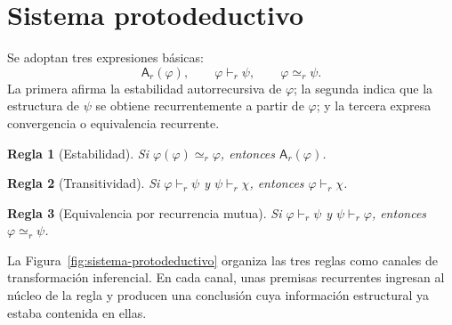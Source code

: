 \documentclass[11pt]{article}
\numberwithin{equation}{section}
\theoremstyle{prism}
\newtheorem{regla}{Regla}
\newcommand{\peq}{\simeq_{\!r}}
\begin{document}
\section{Sistema protodeductivo}

Se adoptan tres expresiones básicas:
\[
  \mathsf{A}_r(\varphi),
  \qquad
  \varphi\vdash_r\psi,
  \qquad
  \varphi\peq\psi.
\]
La primera afirma la estabilidad autorrecursiva de $\varphi$; la segunda indica
que la estructura de $\psi$ se obtiene recurrentemente a partir de $\varphi$; y
la tercera expresa convergencia o equivalencia recurrente.

\begin{regla}[Estabilidad]
Si $\varphi(\varphi)\peq\varphi$, entonces
$\mathsf{A}_r(\varphi)$.
\end{regla}

\begin{regla}[Transitividad]
Si $\varphi\vdash_r\psi$ y $\psi\vdash_r\chi$, entonces
$\varphi\vdash_r\chi$.
\end{regla}

\begin{regla}[Equivalencia por recurrencia mutua]
Si $\varphi\vdash_r\psi$ y $\psi\vdash_r\varphi$, entonces
$\varphi\peq\psi$.
\end{regla}

La Figura~\ref{fig:sistema-protodeductivo} organiza las tres reglas como canales
de transformación inferencial. En cada canal, unas premisas recurrentes ingresan
al núcleo de la regla y producen una conclusión cuya información estructural ya
estaba contenida en ellas.
\end{document}
